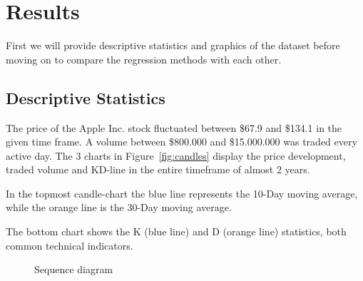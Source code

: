 \documentclass[utf8x]{ctexart}
\begin{document}
\section{Results}

First we will provide descriptive statistics and graphics of the dataset before moving on to compare the regression methods with each other.

\subsection{Descriptive Statistics}

The price of the Apple Inc. stock fluctuated between \$67.9 and \$134.1 in the given time frame. A volume between \$800.000 and \$15.000.000 was traded every active day.
The 3 charts in Figure~\ref{fig:candles} display the price development, traded volume and KD-line in the entire timeframe of almost 2 years.

In the topmost candle-chart the blue line represents the 10-Day moving average, while the orange line is the 30-Day moving average.

The bottom chart shows the K (blue line) and D (orange line) statistics, both common technical indicators.

\label{fig:candles}
\begin{figure}[p]
  \vspace*{-2cm}
  \caption{Sequence diagram}
\end{figure}
\end{document}

